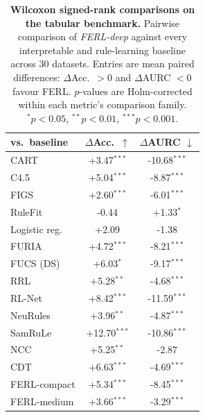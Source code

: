 \begin{table}[h!]
\centering
\small
\caption{\textbf{Wilcoxon signed-rank comparisons on the tabular benchmark.} Pairwise comparison of \emph{FERL-deep} against every interpretable and rule-learning baseline across 30 datasets. Entries are mean paired differences: $\Delta$Acc.\ $>0$ and $\Delta$AURC $<0$ favour FERL. $p$-values are Holm-corrected within each metric's comparison family. $^{*}p<0.05$, $^{**}p<0.01$, $^{***}p<0.001$.}
\label{tab:sig}
\begin{tabular}{@{}lcc@{}}
\toprule
vs.\ baseline & $\Delta$Acc.\ $\uparrow$ & $\Delta$AURC $\downarrow$\\
\midrule
CART & +3.47$^{***}$ & -10.68$^{***}$\\
C4.5 & +5.04$^{***}$ & -8.87$^{***}$\\
FIGS & +2.60$^{***}$ & -6.01$^{***}$\\
RuleFit & -0.44 & +1.33$^{*}$\\
Logistic reg. & +2.09 & -1.38\\
FURIA & +4.72$^{***}$ & -8.21$^{***}$\\
FUCS (DS) & +6.03$^{*}$ & -9.17$^{***}$\\
RRL & +5.28$^{**}$ & -4.68$^{***}$\\
RL-Net & +8.42$^{***}$ & -11.59$^{***}$\\
NeuRules & +3.96$^{**}$ & -4.87$^{***}$\\
SamRuLe & +12.70$^{***}$ & -10.86$^{***}$\\
NCC & +5.25$^{**}$ & -2.87\\
CDT & +6.63$^{***}$ & -4.69$^{***}$\\
FERL-compact & +5.34$^{***}$ & -8.45$^{***}$\\
FERL-medium & +3.66$^{***}$ & -3.29$^{***}$\\
\bottomrule
\end{tabular}
\end{table}
